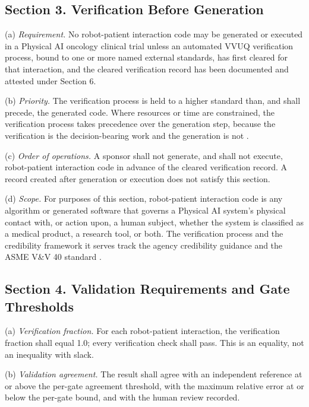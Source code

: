 \subsection{Section 3. Verification Before Generation}

(a) \textit{Requirement.} No robot-patient interaction code may be generated or
executed in a Physical AI oncology clinical trial unless an automated VVUQ
verification process, bound to one or more named external standards, has first
cleared for that interaction, and the cleared verification record has been
documented and attested under Section 6.

(b) \textit{Priority.} The verification process is held to a higher standard
than, and shall precede, the generated code. Where resources or time are
constrained, the verification process takes precedence over the generation step,
because the verification is the decision-bearing work and the generation is
not \cite{kawchak2026vvuq01, kawchak2026vvuq02}.

(c) \textit{Order of operations.} A sponsor shall not generate, and shall not
execute, robot-patient interaction code in advance of the cleared verification
record. A record created after generation or execution does not satisfy this
section.

(d) \textit{Scope.} For purposes of this section, robot-patient interaction code
is any algorithm or generated software that governs a Physical AI system's
physical contact with, or action upon, a human subject, whether the system is
classified as a medical product, a research tool, or both. The verification
process and the credibility framework it serves track the agency credibility
guidance and the ASME V\&V 40 standard \cite{asmevv40, fda2023credibility}.

\subsection{Section 4. Validation Requirements and Gate Thresholds}

(a) \textit{Verification fraction.} For each robot-patient interaction, the
verification fraction shall equal 1.0; every verification check shall pass. This
is an equality, not an inequality with slack.

(b) \textit{Validation agreement.} The result shall agree with an independent
reference at or above the per-gate agreement threshold, with the maximum relative
error at or below the per-gate bound, and with the human review recorded.

